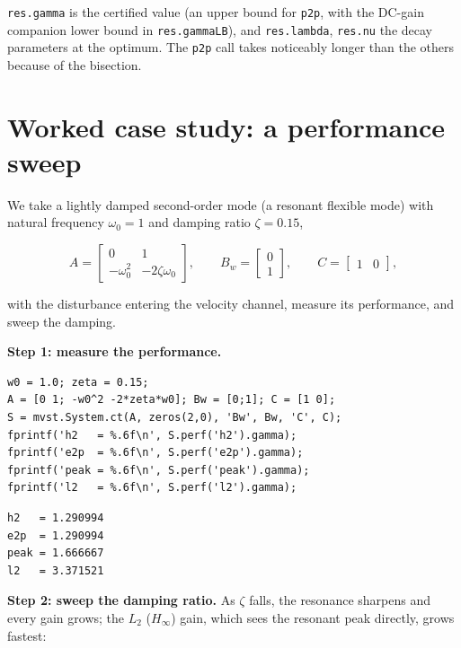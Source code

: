 \documentclass[11pt,oneside]{report}
\newcommand{\code}[1]{\texttt{#1}}
\begin{document}
\code{res.gamma} is the certified value (an upper bound for \code{p2p}, with the DC-gain
companion lower bound in \code{res.gammaLB}), and \code{res.lambda}, \code{res.nu} the decay
parameters at the optimum. The \code{p2p} call takes noticeably longer than the
others because of the bisection.

\hypertarget{worked-case-study-a-performance-sweep}{%
\section{Worked case study: a performance sweep}\label{worked-case-study-a-performance-sweep}}

We take a lightly damped second-order mode (a resonant flexible mode) with
natural frequency \(\omega_0 = 1\) and damping ratio \(\zeta = 0.15\),

\[
A = \begin{bmatrix} 0 & 1 \\ -\omega_0^2 & -2\zeta\omega_0 \end{bmatrix},
\qquad B_w = \begin{bmatrix} 0 \\ 1 \end{bmatrix},
\qquad C = \begin{bmatrix} 1 & 0 \end{bmatrix},
\]

with the disturbance entering the velocity channel, measure its performance, and
sweep the damping.

\textbf{Step 1: measure the performance.}

\begin{lstlisting}[style=matlabstyle]
w0 = 1.0; zeta = 0.15;
A = [0 1; -w0^2 -2*zeta*w0]; Bw = [0;1]; C = [1 0];
S = mvst.System.ct(A, zeros(2,0), 'Bw', Bw, 'C', C);
fprintf('h2   = %.6f\n', S.perf('h2').gamma);
fprintf('e2p  = %.6f\n', S.perf('e2p').gamma);
fprintf('peak = %.6f\n', S.perf('peak').gamma);
fprintf('l2   = %.6f\n', S.perf('l2').gamma);
\end{lstlisting}

\begin{lstlisting}[style=outputstyle]
h2   = 1.290994
e2p  = 1.290994
peak = 1.666667
l2   = 3.371521
\end{lstlisting}

\textbf{Step 2: sweep the damping ratio.} As \(\zeta\) falls, the resonance sharpens
and every gain grows; the \(L_2\) (\(H_\infty\)) gain, which sees the resonant peak
directly, grows fastest:
\end{document}
